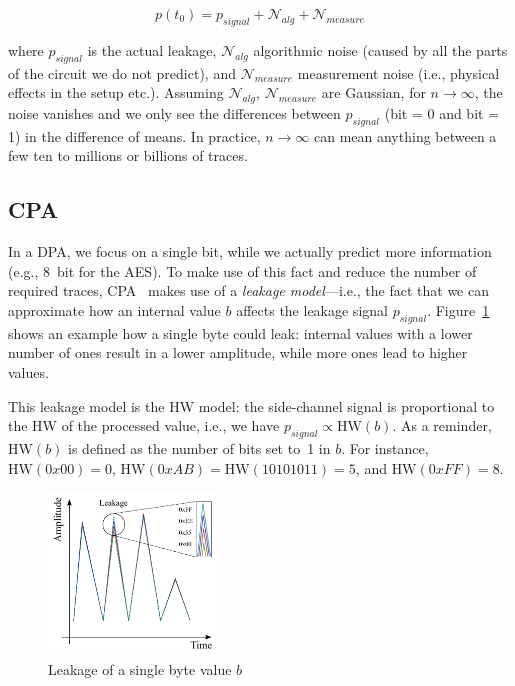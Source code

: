 $$p\left(t_0\right) = p_{signal} + \mathcal{N}_{alg} + \mathcal{N}_{measure}$$

where $p_{signal}$ is the actual leakage, $\mathcal{N}_{alg}$ algorithmic noise (caused by all the parts of the circuit we do not predict), and $\mathcal{N}_{measure}$ measurement noise (i.e., physical effects in the setup etc.). Assuming $\mathcal{N}_{alg}$, $\mathcal{N}_{measure}$ are Gaussian, for $n \rightarrow \infty$, the noise vanishes and we only see the differences between $p_{signal}$ (bit = 0 and bit = 1) in the difference of means. In practice, $n \rightarrow \infty$ can mean anything between a few ten to millions or billions of traces.

\subsection{\acl{CPA}}
In a \ac{DPA}, we focus on a single bit, while we actually predict more information (e.g., 8~bit for the AES). To make use of this fact and reduce the number of required traces, \acf{CPA}~\cite{Brie04} makes use of a \emph{leakage model}---i.e., the fact that we can approximate how an internal value $b$ affects the leakage signal $p_{signal}$. Figure~\ref{fig:impl_attacks:dpa_signal} shows an example how a single byte could leak: internal values with a lower number of ones result in a lower amplitude, while more ones lead to higher values.

This leakage model is the \ac{HW} model: the side-channel signal is proportional to the \ac{HW} of the processed value, i.e., we have $p_{signal} \propto \mbox{HW} \left(b\right)$. As a reminder, $\mbox{HW} \left(b\right)$ is defined as the number of bits set to~1 in $b$. For instance, $\mbox{HW} \left(0x00\right) = 0$, $\mbox{HW}\left(0xAB\right) = \mbox{HW}\left(10101011\right) = 5$, and $\mbox{HW} \left(0xFF\right) = 8$.

\begin{figure}[h!tb]
		\center
		\includegraphics[width=0.4\textwidth]{figures/impl_attacks/dpa_signal}	
		\caption{Leakage of a single byte value $b$}
		\label{fig:impl_attacks:dpa_signal}
\end{figure} 

